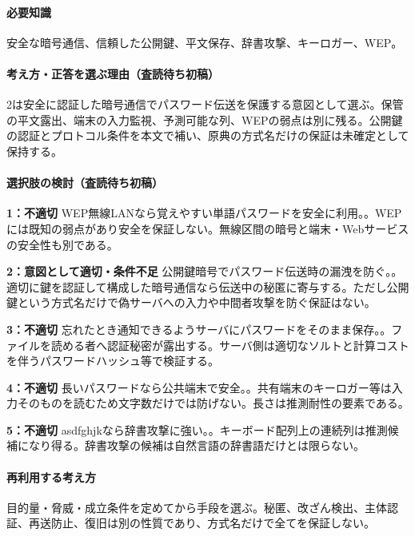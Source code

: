 \paragraph{必要知識} 安全な暗号通信、信頼した公開鍵、平文保存、辞書攻撃、キーロガー、WEP。

\paragraph{考え方・正答を選ぶ理由（査読待ち初稿）} 2は安全に認証した暗号通信でパスワード伝送を保護する意図として選ぶ。保管の平文露出、端末の入力監視、予測可能な列、WEPの弱点は別に残る。公開鍵の認証とプロトコル条件を本文で補い、原典の方式名だけの保証は未確定として保持する。

\paragraph{選択肢の検討（査読待ち初稿）}\mbox{}\par

\noindent\textbf{1：不適切} WEP無線LANなら覚えやすい単語パスワードを安全に利用。。WEPには既知の弱点があり安全を保証しない。無線区間の暗号と端末・Webサービスの安全性も別である。\par

\noindent\textbf{2：意図として適切・条件不足} 公開鍵暗号でパスワード伝送時の漏洩を防ぐ。。適切に鍵を認証して構成した暗号通信なら伝送中の秘匿に寄与する。ただし公開鍵という方式名だけで偽サーバへの入力や中間者攻撃を防ぐ保証はない。\par

\noindent\textbf{3：不適切} 忘れたとき通知できるようサーバにパスワードをそのまま保存。。ファイルを読める者へ認証秘密が露出する。サーバ側は適切なソルトと計算コストを伴うパスワードハッシュ等で検証する。\par

\noindent\textbf{4：不適切} 長いパスワードなら公共端末で安全。。共有端末のキーロガー等は入力そのものを読むため文字数だけでは防げない。長さは推測耐性の要素である。\par

\noindent\textbf{5：不適切} asdfghjkなら辞書攻撃に強い。。キーボード配列上の連続列は推測候補になり得る。辞書攻撃の候補は自然言語の辞書語だけとは限らない。\par

\paragraph{再利用する考え方} 目的量・脅威・成立条件を定めてから手段を選ぶ。秘匿、改ざん検出、主体認証、再送防止、復旧は別の性質であり、方式名だけで全てを保証しない。

